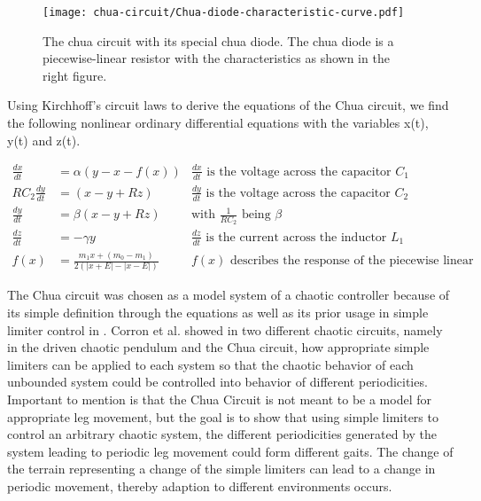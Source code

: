\documentclass[main]{subfiles}
\begin{document}
\begin{figure}[H]
\centering

\texttt{[image: chua-circuit/Chua-diode-characteristic-curve.pdf]}
\caption[The chua circuit]{The chua circuit with its special chua diode. The chua diode is a piecewise-linear resistor with the characteristics as shown in the right figure.}
\label{figure:chuacircuit}
\end{figure}

Using Kirchhoff's circuit laws to derive the equations of the Chua circuit, we find the following nonlinear ordinary differential equations with the variables x(t), y(t) and z(t).

\begin{align*}
\frac{dx}{dt}&=\alpha (y-x-f(x)) &\frac{dx}{dt}\text{ is the voltage across the capacitor }C_1\\
RC_2\frac{dy}{dt}&= (x-y+Rz) &\frac{dy}{dt}\text{ is the voltage across the capacitor }C_2\\
\frac{dy}{dt}&=\beta (x-y+Rz) &\text{with } \frac{1}{RC_2} \text{ being }\beta\\
\frac{dz}{dt}&=-\gamma y &\frac{dz}{dt}\text{ is the current across the inductor }L_1\\
f (x) &= \frac{m_1 x + (m_0 - m_1)}{2 (| x + E | -| x - E |)} &f(x)\text{ describes the response of the piecewise linear resistor}
\end{align*}


The Chua circuit was chosen as a model system of a chaotic controller because of its simple definition through the equations as well as its prior usage in simple limiter control in \cite{bib:Corron2000}. Corron et al. showed in two different chaotic circuits, namely in the driven chaotic pendulum and the Chua circuit, how appropriate simple limiters can be applied to each system so that the chaotic behavior of each unbounded system could be controlled into behavior of different periodicities. Important to mention is that the Chua Circuit is not meant to be a model for appropriate leg movement, but the goal is to show that using simple limiters to control an arbitrary chaotic system, the different periodicities generated by the system leading to periodic leg movement could form different gaits. The change of the terrain representing a change of the simple limiters can lead to a change in periodic movement, thereby adaption to different environments occurs. 
\end{document}
